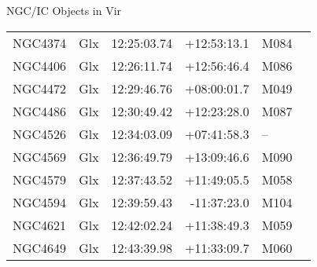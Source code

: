 \begin{block}{NGC/IC Objects in Vir}
  \centering
  \begin{tabularx}{\textwidth}{llrrll} \toprule 
    NGC4374 & Glx & 12:25:03.74 & +12:53:13.1  & M084 \\ 
    NGC4406 & Glx & 12:26:11.74 & +12:56:46.4  & M086 \\ 
    NGC4472 & Glx & 12:29:46.76 & +08:00:01.7  & M049 \\ 
    NGC4486 & Glx & 12:30:49.42 & +12:23:28.0  & M087 \\ 
    NGC4526 & Glx & 12:34:03.09 & +07:41:58.3  & -- \\ 
    NGC4569 & Glx & 12:36:49.79 & +13:09:46.6  & M090 \\ 
    NGC4579 & Glx & 12:37:43.52 & +11:49:05.5  & M058 \\ 
    NGC4594 & Glx & 12:39:59.43 & -11:37:23.0  & M104 \\ 
    NGC4621 & Glx & 12:42:02.24 & +11:38:49.3  & M059 \\ 
    NGC4649 & Glx & 12:43:39.98 & +11:33:09.7  & M060 \\ 
  \end{tabularx}
\end{block}